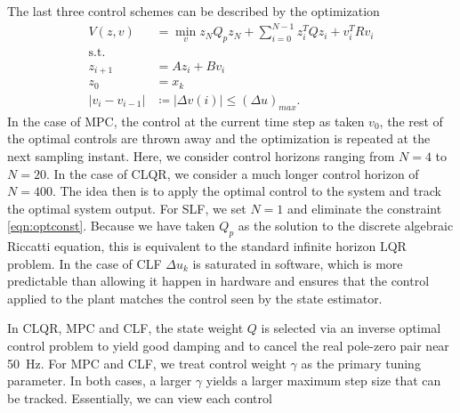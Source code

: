 \documentclass[journal,twocolumn,twoside]{IEEEtran/IEEEtran}
\begin{document}
The last three control schemes can be described by the optimization
\begin{align}
V(z,v) &= \min_{v} z_{N}Q_{p}z_{N} + \sum_{i=0}^{N-1}z_{i}^{T}Qz_{i} + v^{T}_{i}Rv_{i}\\
 \text{s.t.}&\\
z_{i+1} &= Az_{i} + Bv_{i}\\
z_{0} &= x_{k}\\
|v_i - v_{i-1}| &\coloneqq |\Delta v(i)| \leq (\Delta u)_{max}.\label{eqn:optconst}
\end{align}
In the case of MPC, the control at the current time step as taken $v_0$, the rest of the optimal controls are thrown away and the optimization is repeated at the next sampling instant. Here, we consider control horizons ranging from $N=4$ to $N=20$. In the case of CLQR, we consider a much longer control horizon of $N=400$. The idea then is to apply the optimal control to the system and track the optimal system output. For SLF, we set $N=1$ and eliminate the constraint \eqref{eqn:optconst}. Because we have taken $Q_p$ as the solution to the discrete algebraic Riccatti equation, this is equivalent to the standard infinite horizon LQR problem. In the case of CLF $\Delta u_k$ is saturated in software, which is more predictable than allowing it happen in hardware and ensures that the control applied to the plant matches the control seen by the state estimator.

In CLQR, MPC and CLF,  the state weight $Q$ is selected via an inverse optimal control problem to yield good damping and to cancel the real pole-zero pair near 50~Hz. For MPC and CLF, we treat control weight $\gamma$ as the primary tuning parameter. In both cases, a larger $\gamma$ yields a larger maximum step size that can be tracked. Essentially, we can view each control 
\end{document}

